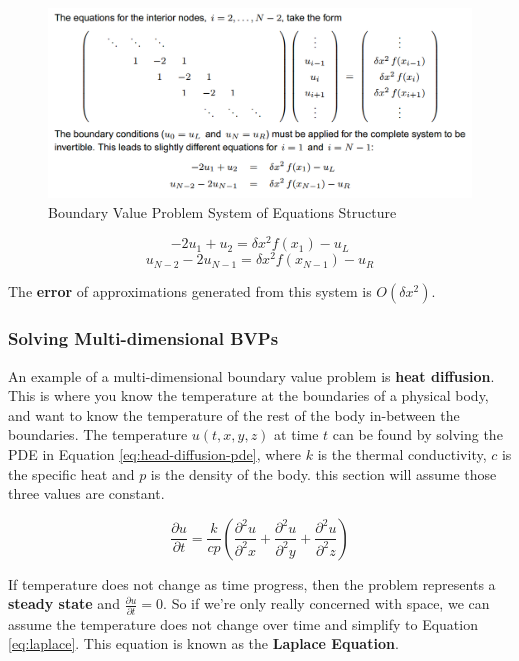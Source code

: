 \documentclass{article}
\begin{document}
\begin{figure}
	\centering
	\includegraphics[scale=0.45]{figures/bvp-system.png}
	\caption{Boundary Value Problem System of Equations Structure}
	\label{fig:bvp-system}
\end{figure}
\begin{equation}
	-2u_1 + u_2 = \delta x^2 f(x_1) - u_L
	\label{eq:bvp-system-1}
\end{equation}
\begin{equation}
	u_{N - 2} - 2u_{N - 1} = \delta x^2 f(x_{N - 1}) - u_R
	\label{eq:bvp-system-2}
\end{equation}

The \textbf{error} of approximations generated from this system is $O(\delta x^2)$.

\subsubsection{Solving Multi-dimensional BVPs}

An example of a multi-dimensional boundary value problem is \textbf{heat diffusion}. This is where you know the temperature at the boundaries of a physical body, and want to know the temperature of the rest of the body in-between the boundaries. The temperature $u(t, x, y, z)$ at time $t$ can be found by solving the PDE in Equation \ref{eq:head-diffusion-pde}, where $k$ is the thermal conductivity, $c$ is the specific heat and $p$ is the density of the body. this section will assume those three values are constant.

\begin{equation}
	\frac{\partial u}{\partial t} = \frac{k}{cp} \left( \frac{\partial^2 u}{\partial^2 x} + \frac{\partial^2 u}{\partial^2 y} + \frac{\partial^2 u}{\partial^2 z}  \right)
	\label{eq:head-diffusion-pde}
\end{equation}

If temperature does not change as time progress, then the problem represents a \textbf{steady state} and $\frac{\partial u}{\partial t} = 0$. So if we're only really concerned with space, we can assume the temperature does not change over time and simplify to Equation \ref{eq:laplace}. This equation is known as the \textbf{Laplace Equation}.
\end{document}
